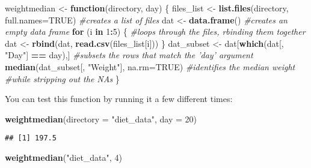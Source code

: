 \documentclass[
]{article}
\newenvironment{Shaded}{\begin{snugshade}}{\end{snugshade}}
\newcommand{\CommentTok}[1]{\textcolor[rgb]{0.56,0.35,0.01}{\textit{#1}}}
\newcommand{\ControlFlowTok}[1]{\textcolor[rgb]{0.13,0.29,0.53}{\textbf{#1}}}
\newcommand{\DataTypeTok}[1]{\textcolor[rgb]{0.13,0.29,0.53}{#1}}
\newcommand{\DecValTok}[1]{\textcolor[rgb]{0.00,0.00,0.81}{#1}}
\newcommand{\KeywordTok}[1]{\textcolor[rgb]{0.13,0.29,0.53}{\textbf{#1}}}
\newcommand{\NormalTok}[1]{#1}
\newcommand{\OperatorTok}[1]{\textcolor[rgb]{0.81,0.36,0.00}{\textbf{#1}}}
\newcommand{\OtherTok}[1]{\textcolor[rgb]{0.56,0.35,0.01}{#1}}
\newcommand{\StringTok}[1]{\textcolor[rgb]{0.31,0.60,0.02}{#1}}
\begin{document}
\begin{Shaded}
\begin{Highlighting}[]
\NormalTok{weightmedian <-}\StringTok{ }\ControlFlowTok{function}\NormalTok{(directory, day)  \{}
\NormalTok{        files_list <-}\StringTok{ }\KeywordTok{list.files}\NormalTok{(directory, }\DataTypeTok{full.names=}\OtherTok{TRUE}\NormalTok{)   }\CommentTok{#creates a list of files}
\NormalTok{        dat <-}\StringTok{ }\KeywordTok{data.frame}\NormalTok{()                             }\CommentTok{#creates an empty data frame}
        \ControlFlowTok{for}\NormalTok{ (i }\ControlFlowTok{in} \DecValTok{1}\OperatorTok{:}\DecValTok{5}\NormalTok{) \{                                }
                \CommentTok{#loops through the files, rbinding them together }
\NormalTok{                dat <-}\StringTok{ }\KeywordTok{rbind}\NormalTok{(dat, }\KeywordTok{read.csv}\NormalTok{(files_list[i]))}
\NormalTok{        \}}
\NormalTok{        dat_subset <-}\StringTok{ }\NormalTok{dat[}\KeywordTok{which}\NormalTok{(dat[, }\StringTok{"Day"}\NormalTok{] }\OperatorTok{==}\StringTok{ }\NormalTok{day),]  }\CommentTok{#subsets the rows that match the 'day' argument}
        \KeywordTok{median}\NormalTok{(dat_subset[, }\StringTok{"Weight"}\NormalTok{], }\DataTypeTok{na.rm=}\OtherTok{TRUE}\NormalTok{)      }\CommentTok{#identifies the median weight }
                                                        \CommentTok{#while stripping out the NAs}
\NormalTok{\}}
\end{Highlighting}
\end{Shaded}

You can test this function by running it a few different times:

\begin{Shaded}
\begin{Highlighting}[]
\KeywordTok{weightmedian}\NormalTok{(}\DataTypeTok{directory =} \StringTok{"diet_data"}\NormalTok{, }\DataTypeTok{day =} \DecValTok{20}\NormalTok{)}
\end{Highlighting}
\end{Shaded}

\begin{verbatim}
## [1] 197.5
\end{verbatim}

\begin{Shaded}
\begin{Highlighting}[]
\KeywordTok{weightmedian}\NormalTok{(}\StringTok{"diet_data"}\NormalTok{, }\DecValTok{4}\NormalTok{)}
\end{Highlighting}
\end{Shaded}
\end{document}
